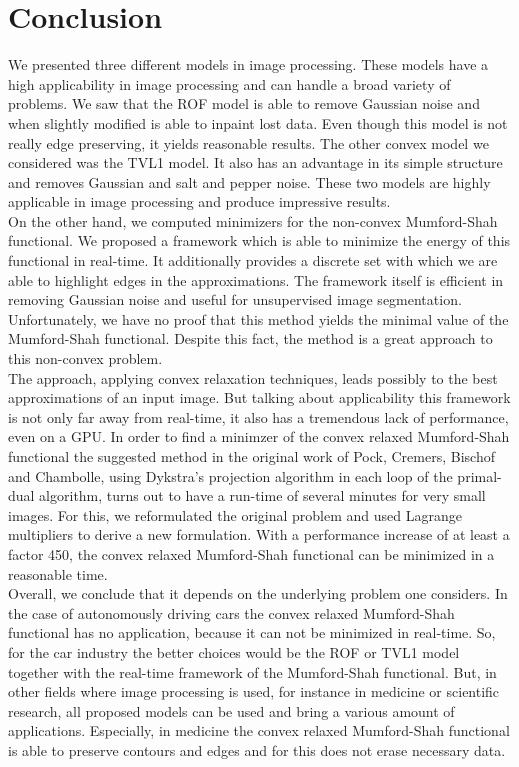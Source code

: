 \documentclass[abstracton]{scrreprt}
\begin{document}
\chapter{Conclusion} %
\label{cha:conclusion}
    We presented three different models in image processing. These models have a high applicability in image processing and can handle a broad variety of problems. We saw that the ROF model is able to remove Gaussian noise and when slightly modified is able to inpaint lost data. Even though this model is not really edge preserving, it yields reasonable results. The other convex model we considered was the TVL1 model. It also has an advantage in its simple structure and removes Gaussian and salt and pepper noise. These two models are highly applicable in image processing and produce impressive results.\\
    On the other hand, we computed minimizers for the non-convex Mumford-Shah functional. We proposed a framework which is able to minimize the energy of this functional in real-time. It additionally provides a discrete set with which we are able to highlight edges in the approximations. The framework itself is efficient in removing Gaussian noise and useful for unsupervised image segmentation. Unfortunately, we have no proof that this method yields the minimal value of the Mumford-Shah functional. Despite this fact, the method is a great approach to this non-convex problem.\\
    The approach, applying convex relaxation techniques, leads possibly to the best approximations of an input image. But talking about applicability this framework is not only far away from real-time, it also has a tremendous lack of performance, even on a GPU. In order to find a minimzer of the convex relaxed Mumford-Shah functional the suggested method in the original work of Pock, Cremers, Bischof and Chambolle, using Dykstra's projection algorithm in each loop of the primal-dual algorithm, turns out to have a run-time of several minutes for very small images. For this, we reformulated the original problem and used Lagrange multipliers to derive a new formulation. With a performance increase of at least a factor 450, the convex relaxed Mumford-Shah functional can be minimized in a reasonable time.\\
    Overall, we conclude that it depends on the underlying problem one considers. In the case of autonomously driving cars the convex relaxed Mumford-Shah functional has no application, because it can not be minimized in real-time. So, for the car industry the better choices would be the ROF or TVL1 model together with the real-time framework of the Mumford-Shah functional. But, in other fields where image processing is used, for instance in medicine or scientific research, all proposed models can be used and bring a various amount of applications. Especially, in medicine the convex relaxed Mumford-Shah functional is able to preserve contours and edges and for this does not erase necessary data.
\end{document}
